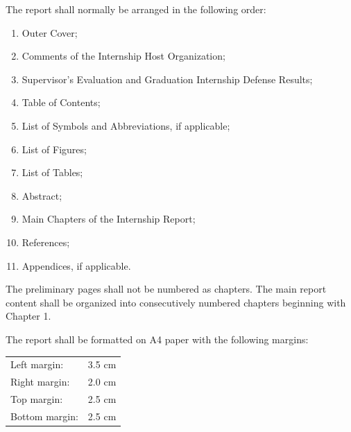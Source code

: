{\noindent
{}

\vspace{0.15cm}

The report shall normally be arranged in the following order:

\begin{enumerate}[label=\arabic*., leftmargin=1.2cm, itemsep=2pt]
    \item Outer Cover;
    \item Comments of the Internship Host Organization;
    \item Supervisor's Evaluation and Graduation Internship Defense Results;
    \item Table of Contents;
    \item List of Symbols and Abbreviations, if applicable;
    \item List of Figures;
    \item List of Tables;
    \item Abstract;
    \item Main Chapters of the Internship Report;
    \item References;
    \item Appendices, if applicable.
\end{enumerate}

The preliminary pages shall not be numbered as chapters. The main report
content shall be organized into consecutively numbered chapters beginning
with Chapter 1.

\vspace{0.3cm}


\noindent
{}

\vspace{0.15cm}

The report shall be formatted on A4 paper with the following margins:

\begin{center}
\begin{tabular}{ll}
    Left margin:   & 3.5 cm \\
    Right margin:  & 2.0 cm \\
    Top margin:    & 2.5 cm \\
    Bottom margin: & 2.5 cm
\end{tabular}
\end{center}

}
